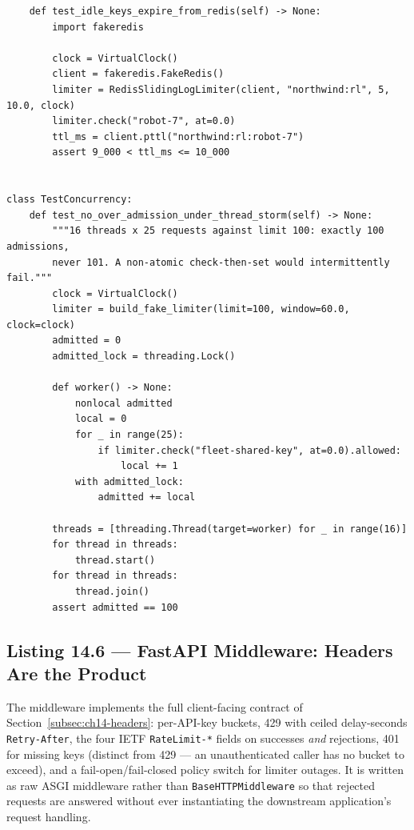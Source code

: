 \begin{verbatim}
    def test_idle_keys_expire_from_redis(self) -> None:
        import fakeredis

        clock = VirtualClock()
        client = fakeredis.FakeRedis()
        limiter = RedisSlidingLogLimiter(client, "northwind:rl", 5, 10.0, clock)
        limiter.check("robot-7", at=0.0)
        ttl_ms = client.pttl("northwind:rl:robot-7")
        assert 9_000 < ttl_ms <= 10_000


class TestConcurrency:
    def test_no_over_admission_under_thread_storm(self) -> None:
        """16 threads x 25 requests against limit 100: exactly 100 admissions,
        never 101. A non-atomic check-then-set would intermittently fail."""
        clock = VirtualClock()
        limiter = build_fake_limiter(limit=100, window=60.0, clock=clock)
        admitted = 0
        admitted_lock = threading.Lock()

        def worker() -> None:
            nonlocal admitted
            local = 0
            for _ in range(25):
                if limiter.check("fleet-shared-key", at=0.0).allowed:
                    local += 1
            with admitted_lock:
                admitted += local

        threads = [threading.Thread(target=worker) for _ in range(16)]
        for thread in threads:
            thread.start()
        for thread in threads:
            thread.join()
        assert admitted == 100
\end{verbatim}

\subsection{Listing 14.6 --- FastAPI Middleware: Headers Are the Product}
\label{subsec:ch14-listing-middleware}

The middleware implements the full client-facing contract of
Section~\ref{subsec:ch14-headers}: per-API-key buckets, 429 with ceiled
delay-seconds \texttt{Retry-After}, the four IETF \texttt{RateLimit-*}
fields on successes \emph{and} rejections, 401 for missing keys (distinct
from 429 --- an unauthenticated caller has no bucket to exceed), and a
fail-open/fail-closed policy switch for limiter outages. It is written as
raw ASGI middleware rather than \texttt{BaseHTTPMiddleware} so that rejected
requests are answered without ever instantiating the downstream
application's request handling.

